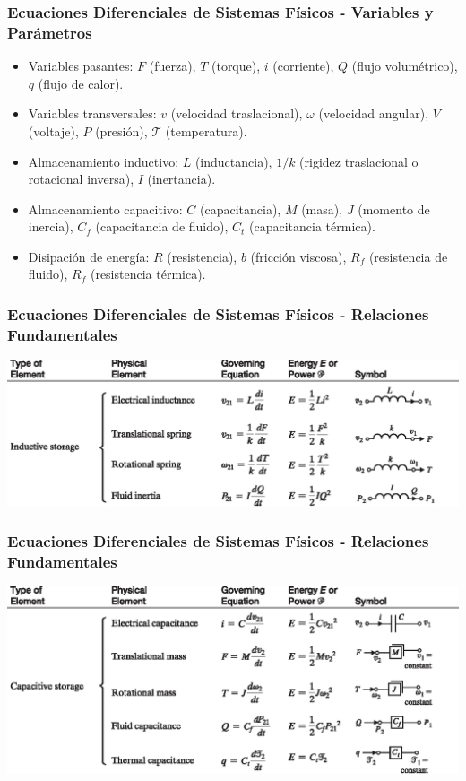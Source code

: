 \documentclass[aspectratio=169,handout]{beamer}
\theoremstyle{definition}
\theoremstyle{plain}
\theoremstyle{remark}
\begin{document}
\begin{frame}[<+->]\frametitle{Ecuaciones Diferenciales de Sistemas Físicos - Variables y Parámetros}
  \begin{itemize}
    \item Variables pasantes: $F$ (fuerza), $T$ (torque), $i$ (corriente), $Q$ (flujo volumétrico), $q$ (flujo de calor).
    \item Variables transversales: $v$ (velocidad traslacional), $\omega$ (velocidad angular), $V$ (voltaje), $P$ (presión), $\mathcal{T}$ (temperatura).
    \item Almacenamiento inductivo: $L$ (inductancia), $1/k$ (rigidez traslacional o rotacional inversa), $I$ (inertancia).
    \item Almacenamiento capacitivo: $C$ (capacitancia), $M$ (masa), $J$ (momento de inercia), $C_f$ (capacitancia de fluido), $C_t$ (capacitancia térmica).
    \item Disipación de energía: $R$ (resistencia), $b$ (fricción viscosa), $R_f$ (resistencia de fluido), $R_f$ (resistencia térmica).
  \end{itemize}
\end{frame}

\begin{frame}[<+->]\frametitle{Ecuaciones Diferenciales de Sistemas Físicos - Relaciones Fundamentales}
\centering
\includegraphics[width=14cm]{images/inductance.eps}
\end{frame}

\begin{frame}[<+->]\frametitle{Ecuaciones Diferenciales de Sistemas Físicos - Relaciones Fundamentales}
\centering
\includegraphics[width=14cm]{images/capacitance.eps}
\end{frame}
\end{document}
